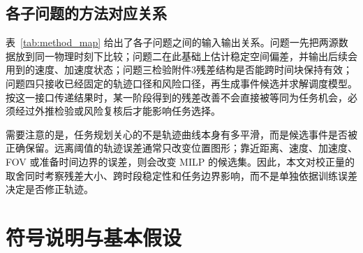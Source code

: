 \documentclass{cumcmthesis}
\begin{document}
\subsection{各子问题的方法对应关系}
\begin{table}[!htbp]
  \centering
  \caption{子问题与方法的对应关系}
  \label{tab:method_map}
  \footnotesize
\end{table}

表~\ref{tab:method_map} 给出了各子问题之间的输入输出关系。问题一先把两源数据放到同一物理时刻下比较；问题二在此基础上估计稳定空间偏差，并输出后续会用到的速度、加速度状态；问题三检验附件3残差结构是否能跨时间块保持有效；问题四只接收已经固定的轨迹口径和风险口径，再生成事件候选并求解调度模型。按这一接口传递结果时，某一阶段得到的残差改善不会直接被等同为任务机会，必须经过外推检验或风险复核后才能影响任务选择。

需要注意的是，任务规划关心的不是轨迹曲线本身有多平滑，而是候选事件是否被正确保留。远离阈值的轨迹误差通常只改变位置图形；靠近距离、速度、加速度、FOV 或准备时间边界的误差，则会改变 MILP 的候选集。因此，本文对校正量的取舍同时考察残差大小、跨时段稳定性和任务边界影响，而不是单独依据训练误差决定是否修正轨迹。

\section{符号说明与基本假设}
\end{document}
